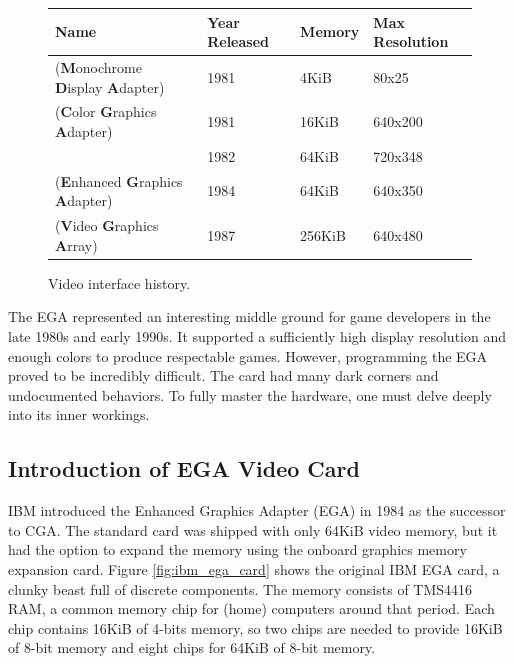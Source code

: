 \documentclass[book.tex]{subfiles}
\begin{document}
\bigskip
 \begin{figure}[H]
\centering  
\begin{tabularx}{\textwidth}{ l X l Y }
  \toprule
  \textbf{Name} &  \textbf{Year Released} & \textbf{Memory} & \textbf{Max Resolution}\\
  \toprule {}
   (\textbf{M}onochrome
   \textbf{D}isplay
   \textbf{A}dapter) & 1981 & 4KiB & 80x25\footnotemark 
   \\ 
   (\textbf{C}olor
   \textbf{G}raphics
   \textbf{A}dapter) & 1981 & 16KiB & 640x200
   \\  & 1982 & 64KiB & 720x348
    \\ 
   (\textbf{E}nhanced
   \textbf{G}raphics
   \textbf{A}dapter) & 1984 & 64KiB & 640x350
   \\ 
   (\textbf{V}ideo
   \textbf{G}raphics
   \textbf{A}rray)  & 1987 & 256KiB & 640x480
    \\
  \toprule
\end{tabularx}
\caption{Video interface history.}\label{fig:vga_history}
   
\end{figure}
\addtocounter{footnote}{-1}

The EGA represented an interesting middle ground for game developers in the late 1980s and early 1990s. It supported a sufficiently high display resolution and enough colors to produce respectable games. However, programming the EGA proved to be incredibly difficult. The card had many dark corners and undocumented behaviors.  To fully master the hardware, one must delve deeply into its inner workings.\\


\subsection{Introduction of EGA Video Card}

IBM introduced the Enhanced Graphics Adapter (EGA) in 1984 as the successor to CGA. The standard card was shipped with only 64KiB video memory, but it had the option to expand the memory using the onboard graphics memory expansion card.
Figure \ref{fig:ibm_ega_card} shows the original IBM EGA card, a clunky beast full of discrete components. The memory consists of TMS4416 RAM, a common memory chip for (home) computers around that period. Each chip contains 16KiB of 4-bits memory, so two chips are needed to provide 16KiB of 8-bit memory and eight chips for 64KiB of 8-bit memory. \\
\end{document}
